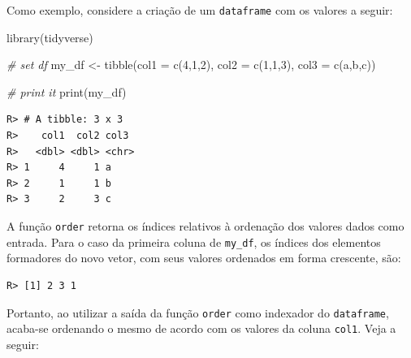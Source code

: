\documentclass[
  11pt,
]{book}
\newenvironment{Shaded}{\begin{snugshade}}{\end{snugshade}}
\newcommand{\AttributeTok}[1]{\textcolor[rgb]{0.61,0.61,0.61}{#1}}
\newcommand{\CommentTok}[1]{\textcolor[rgb]{0.37,0.37,0.37}{\textit{#1}}}
\newcommand{\DecValTok}[1]{\textcolor[rgb]{0.06,0.06,0.06}{#1}}
\newcommand{\FunctionTok}[1]{\textcolor[rgb]{0,0,0}{#1}}
\newcommand{\NormalTok}[1]{#1}
\newcommand{\OtherTok}[1]{\textcolor[rgb]{0.37,0.37,0.37}{#1}}
\newcommand{\SpecialCharTok}[1]{\textcolor[rgb]{0,0,0}{#1}}
\newcommand{\StringTok}[1]{\textcolor[rgb]{0.5,0.5,0.5}{#1}}
\begin{document}
Como exemplo, considere a criação de um \texttt{dataframe} com os valores a seguir:

\begin{Shaded}
\begin{Highlighting}[]
\FunctionTok{library}\NormalTok{(tidyverse)}

\CommentTok{\# set df}
\NormalTok{my\_df }\OtherTok{\textless{}{-}} \FunctionTok{tibble}\NormalTok{(}\AttributeTok{col1 =} \FunctionTok{c}\NormalTok{(}\DecValTok{4}\NormalTok{,}\DecValTok{1}\NormalTok{,}\DecValTok{2}\NormalTok{),}
                \AttributeTok{col2 =} \FunctionTok{c}\NormalTok{(}\DecValTok{1}\NormalTok{,}\DecValTok{1}\NormalTok{,}\DecValTok{3}\NormalTok{),}
                \AttributeTok{col3 =} \FunctionTok{c}\NormalTok{(}\StringTok{\textquotesingle{}a\textquotesingle{}}\NormalTok{,}\StringTok{\textquotesingle{}b\textquotesingle{}}\NormalTok{,}\StringTok{\textquotesingle{}c\textquotesingle{}}\NormalTok{))}

\CommentTok{\# print it}
\FunctionTok{print}\NormalTok{(my\_df)}
\end{Highlighting}
\end{Shaded}

\begin{verbatim}
R> # A tibble: 3 x 3
R>    col1  col2 col3 
R>   <dbl> <dbl> <chr>
R> 1     4     1 a    
R> 2     1     1 b    
R> 3     2     3 c
\end{verbatim}

A função \texttt{order} retorna os índices relativos à ordenação dos valores dados como entrada. Para o caso da primeira coluna de \texttt{my\_df}, os índices dos elementos formadores do novo vetor, com seus valores ordenados em forma crescente, são:

\begin{Shaded}
\end{Shaded}

\begin{verbatim}
R> [1] 2 3 1
\end{verbatim}

Portanto, ao utilizar a saída da função \texttt{order} como indexador do \texttt{dataframe}, acaba-se ordenando o mesmo de acordo com os valores da coluna \texttt{col1}. Veja a seguir:
\end{document}
